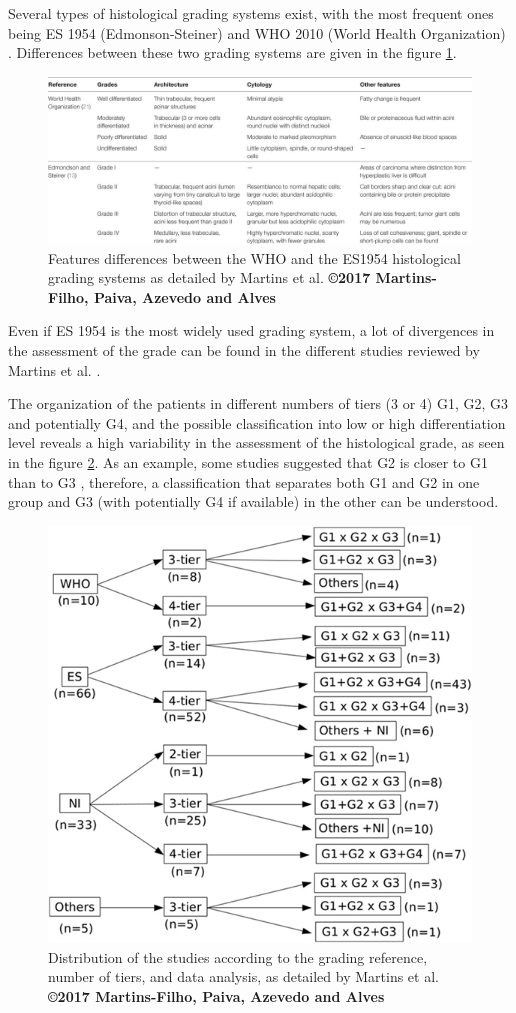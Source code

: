Several types of histological grading systems exist, with the most
frequent ones being ES 1954 (Edmonson-Steiner) \cite{EdmondsonHA1954}
and WHO 2010 (World Health Organization) \cite{20113051318}. Differences between these two
grading systems are given in the figure \ref{fig:martins2017_table1}.

\begin{figure}[th!]
\centering
\includegraphics[width=0.9\linewidth]{../HistologicalGradePrediction/images/martins2017_table1}
\caption{Features differences between the WHO and the ES1954 histological grading systems as detailed by Martins et al. \cite{Martins2017} \textbf{©2017 Martins-Filho, Paiva, Azevedo and Alves}}
\label{fig:martins2017_table1}
\end{figure}

Even if ES 1954 is the most widely used grading system, a lot of
divergences in the assessment of the grade can be found in the different
studies reviewed by Martins et al. \cite{Martins2017}.

The organization of the patients in different numbers of tiers (3 or 4)
G1, G2, G3 and potentially G4, and the possible classification into low
or high differentiation level reveals a high variability in the
assessment of the histological grade, as seen in the figure \ref{fig:martins2017_figure2}.
As an example, some studies suggested that G2 is closer to G1 than to G3 \cite{Han2013,Zucman-Rossi2015}, therefore, a classification that separates
both G1 and G2 in one group and G3 (with potentially G4 if available) in
the other can be understood.\\


\begin{figure}[th!]
\centering
\includegraphics[width=0.5\linewidth]{../HistologicalGradePrediction/images/martins2017_figure2}
\caption{Distribution of the studies according to the grading reference, number of tiers, and data analysis, as detailed by Martins et al. \cite{Martins2017} \textbf{©2017 Martins-Filho, Paiva, Azevedo and Alves}}
\label{fig:martins2017_figure2}
\end{figure}

